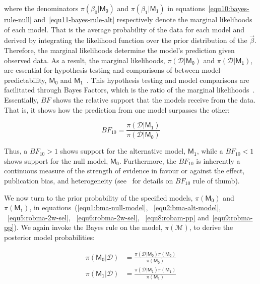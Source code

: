 \documentclass[12pt, english]{article}
\begin{document}
    where the denominators $\pi(\beta_0 | \mathsf{M_0})$ and $\pi(\beta_1 | \mathsf{M_1})$ in equations~\ref{equ10:bayes-rule-null} and~\ref{equ11-bayes-rule-alt} respectively denote the marginal likelihoods of each model. That is the average probability of the data for each model and derived by integrating the likelihood function over the prior distribution of the $\vec{\beta}$. Therefore, the marginal likelihoods determine the model's prediction given observed data. As a result, the marginal likelihoods, $\pi(\mathcal{D}  |\mathsf{M_0})$ and $\pi(\mathcal{D} | \mathsf{M_1})$, are essential for hypothesis testing and comparisons of between-model-predictability, $\mathsf{M_0}$ and $\mathsf{M_1}$~\parencite{jefferysberger1992}. This hypothesis testing and model comparisons are facilitated through Bayes Factors, which is the ratio of the marginal likelihoods~\parencites{roudermorey2019, etzwagenmakers2017, kassraftery1995, wrinchjeffreys1921}. Essentially, $BF$ shows the relative support that the models receive from the data. That is, it shows how the prediction from one model surpasses the other:

    \begin{equation}
        \label{equ12:bayes-factor}
        BF_{10}=\frac{\pi(\mathcal{D}|\mathsf{M_1})}{\pi(\mathcal{D}|\mathsf{M_0})}
    \end{equation}

    Thus, a $BF_{10}>1$ shows support for the alternative model, $\mathsf{M_1}$, while a $BF_{10}<1$ shows support for the null model, $\mathsf{M_0}$. Furthermore, the $BF_{10}$ is inherently a continuous measure of the strength of evidence in favour or against the effect, publication bias, and heterogeneity (see~\parencites{bartos2022, leewagenmakers2013, jeffreys1998} for details on $BF_{10}$ rule of thumb).

    We now turn to the prior probability of the specified models, $\pi(\mathsf{M_0})$ and $\pi(\mathsf{M_1})$, in equations~(\ref{equ1:bma-null-model}, ~\ref{equ2:bma-alt-model}, ~\ref{equ5:robma-2w-sel}, ~\ref{equ6:robma-2w-sel}, ~\ref{equ8:robam-pp} and~\ref{equ9:robma-pp}). We again invoke the Bayes rule on the model, $\pi(\mathcal{M})$, to derive the posterior model probabilities:

    \begin{align}
        \pi(\mathsf{M_0} | \mathcal{D}) &= \frac{\pi(\mathcal{D} | \mathsf{M_0})\pi(\mathsf{M_0})}{\pi(\mathsf{M_0})} \label{equ13} \\
        \pi(\mathsf{M_1} | \mathcal{D}) &= \frac{\pi(\mathcal{D} | \mathsf{M_1})\pi(\mathsf{M_1})}{\pi(\mathsf{M_1})} \label{equ14}
    \end{align}
\end{document}
